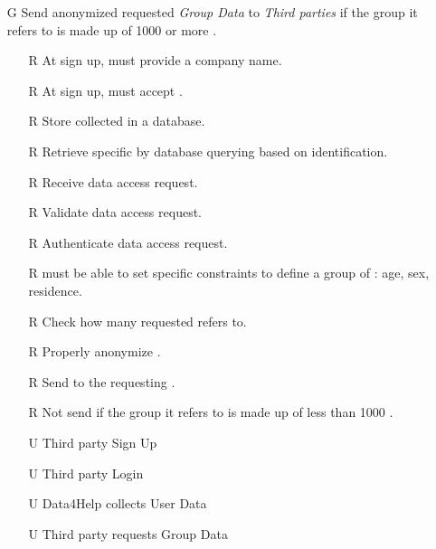 \documentclass[../../../rasd.tex]{subfiles}
\begin{document}
\begin{itemize}
	\item[G\subs{3}]Send anonymized requested \textit{Group Data} to \textit{Third parties} if the group it refers to is made up of 1000 or more .
	\begin{itemize}
		\item[R\subs{3}]At sign up,  must provide a company name.
		\item[R\subs{5}]At sign up,  must accept .
		\item[R\subs{11}]Store collected  in a database.
		\item[R\subs{12}]Retrieve specific  by database querying based on  identification.
		\item[R\subs{13}]Receive  data access request.
		\item[R\subs{14}]Validate  data access request.
		\item[R\subs{15}]Authenticate  data access request.
		\item[R\subs{21}] must be able to set specific constraints to define a group of : age, sex, residence.
		\item[R\subs{22}]Check how many  requested  refers to.
		\item[R\subs{23}]Properly anonymize .
		\item[R\subs{24}]Send  to the requesting .
		\item[R\subs{25}]Not send  if the group it refers to is made up of less than 1000 .
		\\
		\item[U\subs{2}]Third party Sign Up
		\item[U\subs{4}]Third party Login
		\item[U\subs{5}]Data4Help collects User Data
		\item[U\subs{7}]Third party requests Group Data
	\end{itemize}


\end{itemize}
\end{document}
